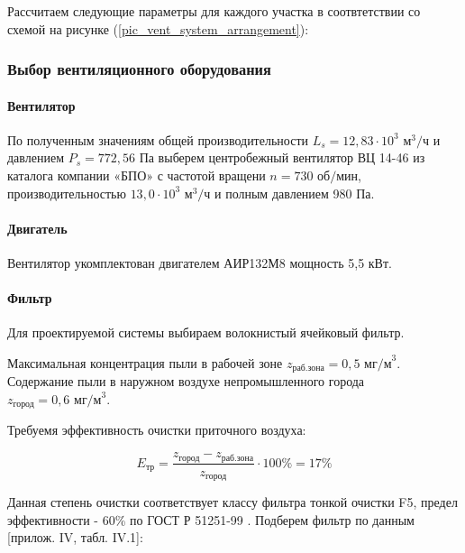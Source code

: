 Рассчитаем следующие параметры для каждого участка в соотвтетствии со схемой на
рисунке (\ref{pic_vent_system_arrangement}):



\subsubsection{Выбор вентиляционного оборудования}

\paragraph{Вентилятор}
По полученным значениям общей производительности $L_s = 12,83 \cdot 10^3 \text{ м}^3 / \text{ч}$
и давлением $P_s = 772,56 \text{ Па}$ выберем центробежный
вентилятор ВЦ 14-46 из каталога компании «БПО» с частотой вращени
$n = 730 \text{ об/мин}$, производительностью $13,0 \cdot 10^3 \text{ м}^3 / \text{ч}$
и полным давлением 980 Па.

\paragraph{Двигатель}
Вентилятор укомплектован двигателем АИР132М8 мощность 5,5 кВт.

\paragraph{Фильтр}
Для проектируемой системы выбираем волокнистый ячейковый фильтр.

Максимальная концентрация пыли в рабочей зоне $z_\text{раб.зона} = 0,5 \text{ мг/м}^3$.
Содержание пыли в наружном воздухе непромышленного города $z_\text{город} = 0,6 \text{ мг/м}^3$.

Требуемя эффективность очистки приточного воздуха:

$$
    E_\text{тр} = \frac{z_\text{город} - z_\text{раб.зона}}{z_\text{город}} \cdot 100 \% = 17 \%
$$

Данная степень очистки соответствует классу фильтра тонкой очистки F5, предел
эффективности - 60\% по ГОСТ Р 51251-99 \cite{ecology_gost_51251_99}.
Подберем фильтр по данным \cite{air_ventilation_and_conditioning}[прилож. IV, табл. IV.1]:

